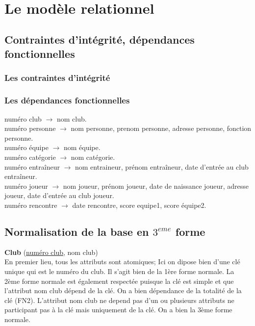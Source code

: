 \documentclass{article}
\begin{document}
\newpage
\section{Le modèle relationnel}


\subsection{Contraintes d'intégrité, dépendances fonctionnelles}

\subsubsection*{Les contraintes d'intégrité}


\newpage
\subsubsection*{Les dépendances fonctionnelles}

numéro club $\rightarrow$ nom club.  \\
numéro personne $\rightarrow$ nom personne, prenom personne, adresse personne, fonction personne. \\
numéro équipe $\rightarrow$ nom équipe.\\
numéro catégorie $\rightarrow$ nom catégorie.\\
numéro entraîneur $\rightarrow$ nom entraineur, prénom entraîneur, date d'entrée au club entraîneur. \\
numéro joueur $\rightarrow$ nom joueur, prénom joueur, date de naissance joueur, adresse joueur, date d'entrée au club joueur. \\
numéro rencontre $\rightarrow$ date rencontre, score equipe1, score équipe2. \\



\subsection{Normalisation de la base en $3^{eme}$ forme}

\textbf{Club} (\underline{numéro club}, nom club) \\
En premier lieu, tous les attributs sont atomiques; Ici on dipose bien d'une clé unique qui est le numéro du club. Il s'agit bien de la 1ère forme normale. La 2ème forme normale est également respectée puisque la clé est simple et que l'attribut nom club dépend de la clé. On a bien dépendance de la totalité de la clé (FN2). L'attribut nom club ne depend pas d'un ou plusieurs attributs ne participant pas à la clé mais uniquement de la clé. On a bien la 3ème forme normale. \\
\end{document}
